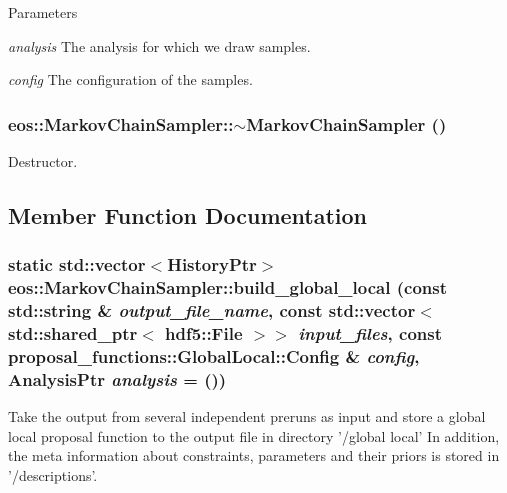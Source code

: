 \begin{DoxyParams}{Parameters}
\item[{\em analysis}]The analysis for which we draw samples. \item[{\em config}]The configuration of the samples. \end{DoxyParams}
\hypertarget{classeos_1_1MarkovChainSampler_a9c8a8f22a6279a0e0457b6e58b3e7aee}{
\subsubsection[{$\sim$MarkovChainSampler}]{\setlength{\rightskip}{0pt plus 5cm}eos::MarkovChainSampler::$\sim$MarkovChainSampler ()}}
\label{classeos_1_1MarkovChainSampler_a9c8a8f22a6279a0e0457b6e58b3e7aee}


Destructor. 

\subsection{Member Function Documentation}
\hypertarget{classeos_1_1MarkovChainSampler_ae493008479f15b080c40365f96a3e409}{
\subsubsection[{build\_\-global\_\-local}]{\setlength{\rightskip}{0pt plus 5cm}static std::vector$<${\bf HistoryPtr}$>$ eos::MarkovChainSampler::build\_\-global\_\-local (const std::string \& {\em output\_\-file\_\-name}, \/  const std::vector$<$ std::shared\_\-ptr$<$ {\bf hdf5::File} $>$$>$ {\em input\_\-files}, \/  const {\bf proposal\_\-functions::GlobalLocal::Config} \& {\em config}, \/  {\bf AnalysisPtr} {\em analysis} = {()})}}
\label{classeos_1_1MarkovChainSampler_ae493008479f15b080c40365f96a3e409}
Take the output from several independent preruns as input and store a global local proposal function to the output file in directory '/global local' In addition, the meta information about constraints, parameters and their priors is stored in '/descriptions'.


